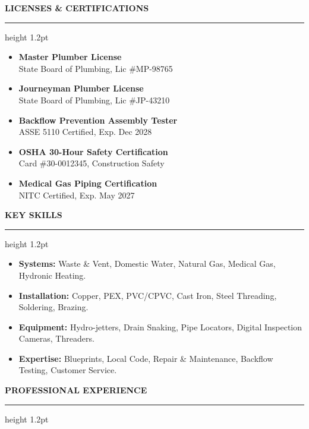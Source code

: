 \documentclass[10pt]{article}
\newcommand{\resumesection}[2]{%
  \vspace{6pt}
  \noindent
  {\color{primary}\large\bfseries #1\quad \MakeUppercase{#2}}
  \vspace{1pt}
  {\color{secondary}\hrule height 1.2pt}
  \vspace{3pt}
}
\begin{document}
\noindent
\begin{minipage}[t]{0.48\textwidth}
  \resumesection{\faCertificate}{Licenses \& Certifications}
  \begin{itemize}
    \item \textbf{Master Plumber License} \\ State Board of Plumbing, Lic \#MP-98765
    \item \textbf{Journeyman Plumber License} \\ State Board of Plumbing, Lic \#JP-43210
    \item \textbf{Backflow Prevention Assembly Tester} \\ ASSE 5110 Certified, Exp. Dec 2028
    \item \textbf{OSHA 30-Hour Safety Certification} \\ Card \#30-0012345, Construction Safety
    \item \textbf{Medical Gas Piping Certification} \\ NITC Certified, Exp. May 2027
  \end{itemize}
\end{minipage}
\hfill
\begin{minipage}[t]{0.48\textwidth}
  \resumesection{\faWrench}{Key Skills}
  \begin{itemize}
    \item \textbf{Systems:} Waste \& Vent, Domestic Water, Natural Gas, Medical Gas, Hydronic Heating.
    \item \textbf{Installation:} Copper, PEX, PVC/CPVC, Cast Iron, Steel Threading, Soldering, Brazing.
    \item \textbf{Equipment:} Hydro-jetters, Drain Snaking, Pipe Locators, Digital Inspection Cameras, Threaders.
    \item \textbf{Expertise:} Blueprints, Local Code, Repair \& Maintenance, Backflow Testing, Customer Service.
  \end{itemize}
\end{minipage}
\par
\vspace{4pt}

\resumesection{\faBriefcase}{Professional Experience}
\end{document}
